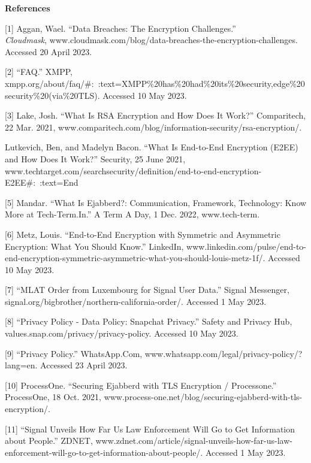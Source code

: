 \documentclass[12pt]{article}
\begin{document}
\vspace{1cm}

\textbf{References}

[1] Aggan, Wael. “Data Breaches: The Encryption Challenges.” \\
\emph {Cloudmask}, www.cloudmask.com/blog/data-breaches-the-encryption-challenges. Accessed 20 April 2023.

[2] “FAQ.” XMPP, \\ xmpp.org/about/faq/#:~:text=XMPP\%20has\%20had\%20its\%20security,edge\%20security\%20(via\%20TLS). Accessed 10 May 2023.

[3] Lake, Josh. “What Is RSA Encryption and How Does It Work?” Comparitech, 22 Mar. 2021, www.comparitech.com/blog/information-security/rsa-encryption/.

\RaggedRight[4] Lutkevich, Ben, and Madelyn Bacon. “What Is End-to-End Encryption (E2EE) and How Does It Work?” Security, 25 June 2021, www.techtarget.com/searchsecurity/definition/end-to-end-encryption-E2EE#:~:text=End


[5] Mandar. “What Is Ejabberd?: Communication, Framework, Technology: Know More at Tech-Term.In.” A Term A Day, 1 Dec. 2022, www.tech-term.

[6] Metz, Louis. “End-to-End Encryption with Symmetric and Asymmetric Encryption: What You Should Know.” LinkedIn, www.linkedin.com/pulse/end-to-end-encryption-symmetric-asymmetric-what-you-should-louis-metz-1f/. Accessed 10 May 2023.

[7] “MLAT Order from Luxembourg for Signal User Data.” Signal Messenger, \\ signal.org/bigbrother/northern-california-order/. Accessed 1 May 2023.

[8] “Privacy Policy - Data Policy: Snapchat Privacy.” Safety and Privacy Hub,\\ values.snap.com/privacy/privacy-policy. Accessed 10 May 2023.

[9] “Privacy Policy.” WhatsApp.Com, www.whatsapp.com/legal/privacy-policy/?lang=en. Accessed 23 April 2023.

[10] ProcessOne. “Securing Ejabberd with TLS Encryption / Processone.” ProcessOne, 18 Oct. 2021, www.process-one.net/blog/securing-ejabberd-with-tls-encryption/.

[11] “Signal Unveils How Far Us Law Enforcement Will Go to Get Information about People.” ZDNET, www.zdnet.com/article/signal-unveils-how-far-us-law-enforcement-will-go-to-get-information-about-people/. Accessed 1 May 2023.
\end{document}
